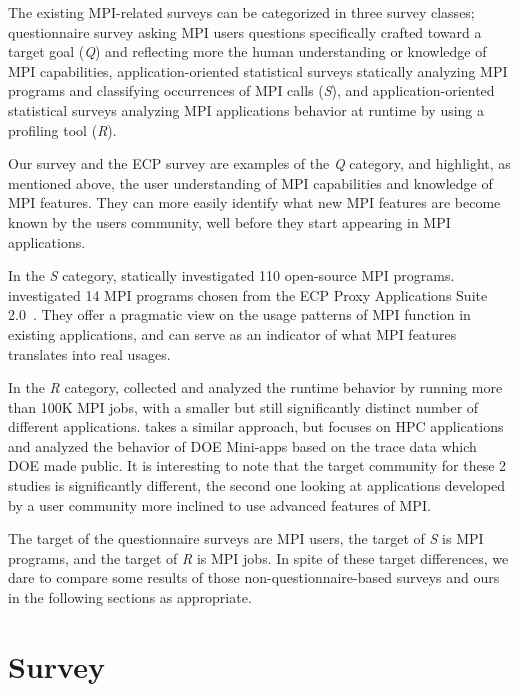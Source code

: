 \documentclass[preprint,5p,times]{elsarticle}
\begin{document}
The existing MPI-related surveys can be categorized in three survey classes;
%
questionnaire survey asking MPI users questions specifically crafted toward a
target goal ({\em Q}) and reflecting more the human understanding or knowledge of MPI capabilities,
%
application-oriented statistical surveys statically analyzing MPI programs and
classifying occurrences of MPI calls ({\em S}),
%
and application-oriented statistical surveys analyzing MPI applications behavior
at runtime by using a profiling tool ({\em R}).

Our survey and the ECP survey are examples of the {\em Q} category, and highlight, as mentioned above, the user understanding of MPI capabilities and knowledge of MPI features. They can more easily identify what new MPI features are become known by the users community, well before they start appearing in MPI applications.

In the {\em S} category, \cite{10.1145/3295500.3356176} statically investigated
110 open-source MPI programs. \cite{cpe-5901}
investigated 14 MPI programs chosen from the ECP Proxy Applications Suite
2.0~\cite{osti-1482870}. They offer a pragmatic view on the usage patterns of
MPI function in existing applications, and can serve as an indicator of what MPI
features translates into real usages.

In the {\em R} category, \cite{8665758} collected and
analyzed the runtime behavior by running more than 100K MPI
jobs, with a smaller but still significantly distinct number of different applications. \cite{10.1007/978-3-319-58667-0-12} takes a similar approach, but focuses on HPC applications and analyzed the behavior of DOE
Mini-apps based on the trace data which DOE made public. It is interesting to note that the target community for these 2 studies is significantly different, the second one looking at applications developed by a user community more inclined to use advanced features of MPI.

The target of the questionnaire surveys are MPI users, the target of
{\em S} is MPI programs, and the target of {\em R} is MPI jobs. In spite of
these target differences, we dare to compare some results of those
non-questionnaire-based surveys and ours in the
following sections as appropriate.

\section{Survey}
\end{document}
